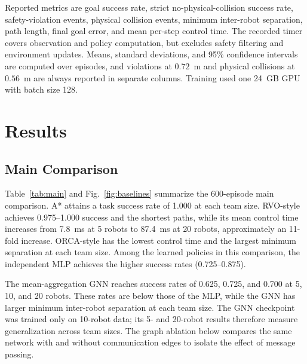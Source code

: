 \documentclass[conference]{IEEEtran}
\begin{document}
Reported metrics are goal success rate, strict no-physical-collision success
rate, safety-violation events, physical collision events, minimum inter-robot
separation, path length, final goal error, and mean per-step control time. The recorded timer covers observation and
policy computation, but excludes safety filtering and environment updates.
Means, standard deviations, and 95\% confidence intervals are computed over
episodes, and violations at $0.72$~m and physical collisions at $0.56$~m are
always reported in separate columns. Training used one 24~GB GPU with batch
size 128.

\section{Results}
\label{sec:results}

\subsection{Main Comparison}
Table~\ref{tab:main} and Fig.~\ref{fig:baselines} summarize the 600-episode main comparison. A* attains
a task success rate of 1.000 at each team size. RVO-style achieves
0.975--1.000 success and the shortest paths, while its mean control time
increases from 7.8~ms at 5 robots to 87.4~ms at 20 robots, approximately an
11-fold increase. ORCA-style has the lowest control time and the largest
minimum separation at each team size. Among the learned policies in this
comparison, the independent MLP achieves the higher success rates
(0.725--0.875).

The mean-aggregation GNN reaches success rates of 0.625, 0.725, and 0.700
at 5, 10, and 20 robots. These rates are below those of the MLP, while the
GNN has larger minimum inter-robot separation at each team size. The GNN
checkpoint was trained only on 10-robot data; its 5- and 20-robot results
therefore measure generalization across team sizes. The graph ablation below
compares the same network with and without communication edges to isolate
the effect of message passing.
\end{document}
